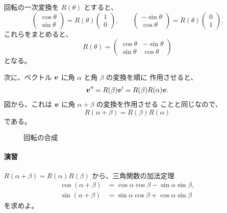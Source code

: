 回転の一次変換を $R(\theta)$ とすると、
\[
 \begin{pmatrix}\cos\theta\\\sin\theta\end{pmatrix}
 =R(\theta)\begin{pmatrix}1\\0\end{pmatrix},\qquad
 \begin{pmatrix}-\sin\theta\\\cos\theta\end{pmatrix}
 =R(\theta)\begin{pmatrix}0\\1\end{pmatrix}.
\]
これらをまとめると、
\begin{equation}
 \boxed{R(\theta)=
 \begin{pmatrix}
  \cos\theta&-\sin\theta\\
  \sin\theta& \cos\theta
 \end{pmatrix}}
\end{equation}
となる。

次に、ベクトル $\bm{v}$ に角 $\alpha$ と角 $\beta$ の変換を順に
作用させると、
\[
 \bm{v}''=R(\beta)\bm{v}'=R(\beta)R(\alpha)\bm{v}.
\]
図から、これは $\bm{v}$ に角 $\alpha+\beta$ の変換を作用させる
ことと同じなので、
\begin{equation}
 \boxed{R(\alpha+\beta)=R(\beta)R(\alpha)}
\end{equation}
である。

\begin{figure}[htbp]
\centering
{}
\caption{回転の合成}
\end{figure}

\paragraph{演習}
$R(\alpha+\beta)=R(\alpha)R(\beta)$ から、三角関数の加法定理
\begin{align*}
 \cos(\alpha+\beta)&=\cos\alpha\cos\beta-\sin\alpha\sin\beta,\\
 \sin(\alpha+\beta)&=\sin\alpha\cos\beta+\cos\alpha\sin\beta
\end{align*}
を求めよ。

